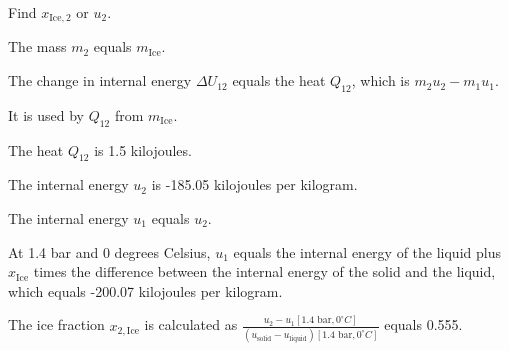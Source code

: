 Find \( x_{\text{Ice},2} \) or \( u_2 \).

The mass \( m_2 \) equals \( m_{\text{Ice}} \).

The change in internal energy \( \Delta U_{12} \) equals the heat \( Q_{12} \), which is \( m_2 u_2 - m_1 u_1 \).

It is used by \( Q_{12} \) from \( m_{\text{Ice}} \).

The heat \( Q_{12} \) is 1.5 kilojoules.

The internal energy \( u_2 \) is -185.05 kilojoules per kilogram.

The internal energy \( u_1 \) equals \( u_2 \).

At 1.4 bar and 0 degrees Celsius, \( u_1 \) equals the internal energy of the liquid plus \( x_{\text{Ice}} \) times the difference between the internal energy of the solid and the liquid, which equals -200.07 kilojoules per kilogram.

The ice fraction \( x_{2, \text{Ice}} \) is calculated as \( \frac{u_2 - u_{1} [1.4 \text{ bar}, 0^\circ C]}{(u_{\text{solid}} - u_{\text{liquid}}) [1.4 \text{ bar}, 0^\circ C]} \) equals 0.555.